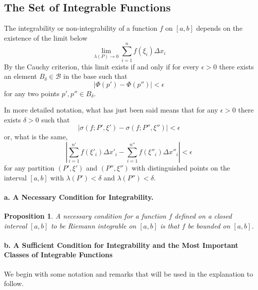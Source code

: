 \documentclass[a4paper,12pt]{article} %
\newtheorem{proposition}{Proposition}[section]
\begin{document}
\subsection{The Set of Integrable Functions}
The integrability or non-integrability of a function $f$ on $[a,b]$
depends on the existence of the limit below 
\[
    \lim_{\lambda(P)\to 0}\sum_{i=1}^nf(\xi_i)\Delta x_i
\]
By the Cauchy criterion, this limit exists if and only if for every 
$\epsilon > 0$ there exists an element $B_{\delta} \in \mathcal{B}$ in the base such that 
\[
    \left\vert \Phi(p') - \Phi(p'')\right\vert < \epsilon
    \]
for any two points $p', p'' \in B_{\delta}$.

In more detailed notation, what has just been said means that for 
any $\epsilon > 0$ there exists $\delta > 0$ such that 
\[
    \left\vert \sigma(f;P',\xi') - \sigma(f;P'',\xi'')\right\vert < \epsilon
    \]
or, what is the same,
\[
    \left\vert \sum_{i=1}^{n'}f(\xi'_i)\Delta x'_i - \sum_{i=1}^{n''}f(\xi''_i)\Delta x''_i\right\vert 
    < \epsilon 
    \]
for any partition $(P',\xi')$ and $(P'',\xi'')$ with distinguished points 
on the interval $[a,b]$ with $\lambda(P') < \delta$ and $\lambda(P'') < \delta$.

\paragraph{\rm \textbf{a. A Necessary Condition for Integrability.}}
\begin{proposition}
    \normalfont
    A necessary condition for a function $f$ defined on a closed interval 
    $[a,b]$ to be Riemann integrable on $[a,b]$ is that $f$ be bounded on 
    $[a,b]$.
\end{proposition}

\paragraph{\rm \textbf{b. A Sufficient Condition for Integrability and the 
Most Important Classes of Integrable Functions}}
We begin with some notation and remarks that will be used in the explanation 
to follow.
\end{document}
